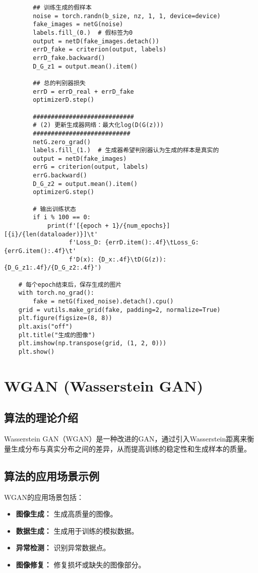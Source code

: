 \begin{lstlisting}
        ## 训练生成的假样本
        noise = torch.randn(b_size, nz, 1, 1, device=device)
        fake_images = netG(noise)
        labels.fill_(0.)  # 假标签为0
        output = netD(fake_images.detach())
        errD_fake = criterion(output, labels)
        errD_fake.backward()
        D_G_z1 = output.mean().item()

        ## 总的判别器损失
        errD = errD_real + errD_fake
        optimizerD.step()

        ############################
        # (2) 更新生成器网络：最大化log(D(G(z)))
        ###########################
        netG.zero_grad()
        labels.fill_(1.)  # 生成器希望判别器认为生成的样本是真实的
        output = netD(fake_images)
        errG = criterion(output, labels)
        errG.backward()
        D_G_z2 = output.mean().item()
        optimizerG.step()

        # 输出训练状态
        if i % 100 == 0:
            print(f'[{epoch + 1}/{num_epochs}][{i}/{len(dataloader)}]\t'
                  f'Loss_D: {errD.item():.4f}\tLoss_G: {errG.item():.4f}\t'
                  f'D(x): {D_x:.4f}\tD(G(z)): {D_G_z1:.4f}/{D_G_z2:.4f}')

    # 每个epoch结束后，保存生成的图片
    with torch.no_grad():
        fake = netG(fixed_noise).detach().cpu()
    grid = vutils.make_grid(fake, padding=2, normalize=True)
    plt.figure(figsize=(8, 8))
    plt.axis("off")
    plt.title("生成的图像")
    plt.imshow(np.transpose(grid, (1, 2, 0)))
    plt.show()

\end{lstlisting}


\section{WGAN (Wasserstein GAN)}
\subsection*{算法的理论介绍}
Wasserstein GAN（WGAN）是一种改进的GAN，通过引入Wasserstein距离来衡量生成分布与真实分布之间的差异，从而提高训练的稳定性和生成样本的质量。

\subsection*{算法的应用场景示例}
WGAN的应用场景包括：
\begin{itemize}
    \item \textbf{图像生成：} 生成高质量的图像。
    \item \textbf{数据生成：} 生成用于训练的模拟数据。
    \item \textbf{异常检测：} 识别异常数据点。
    \item \textbf{图像修复：} 修复损坏或缺失的图像部分。
\end{itemize}

